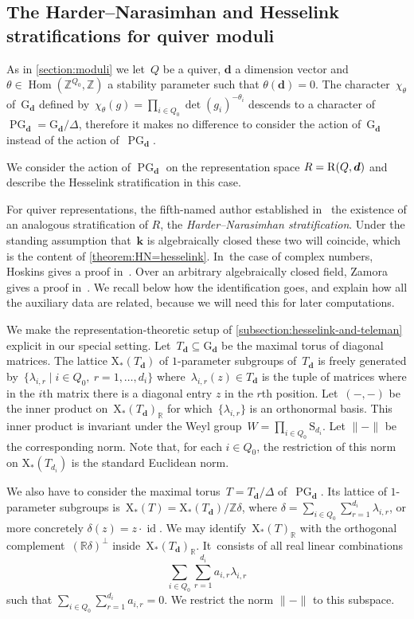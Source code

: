 \documentclass[11pt]{article}
\newcommand{\Subsection}{\subsection}
\theoremstyle{plain}
\theoremstyle{definition}
\DeclareMathOperator\Hom{Hom}
\DeclareMathOperator\PG{PG}
\newcommand\cocharacters{\ensuremath{\mathrm{X}_*}}
\newcommand\field{\mathbf{k}}
\newcommand\group[1][\tuple{d}]{\mathrm{G}_{#1}}
\newcommand\tuple[1]{\ensuremath{{\boldsymbol{#1}}}}
\begin{document}
\Subsection{The Harder--Narasimhan and Hesselink stratifications for quiver moduli}
\label{section:HN-vs-Hesselink}
As in \cref{section:moduli}
we let~$Q$ be a quiver, $\tuple{d}$ a dimension vector
and~$\theta \in\Hom(\mathbb{Z}^{Q_0},\mathbb{Z})$ a stability parameter
such that $\theta(\tuple{d})=0$.
The character~$\chi_\theta$ of~$\group$ defined by~$\chi_\theta(g) = \prod_{i \in Q_0} \det(g_i)^{-\theta_i}$
descends to a character of~$\PG_{\tuple{d}} = \group/\Delta$,
therefore it makes no difference to consider the action of~$\group$ instead of the action of~$\PG_{\tuple{d}}$.

We consider the action of $\PG_{\tuple{d}}$ on the representation space $R = \repspace{Q,\tuple{d}}$
and describe the Hesselink stratification in this case.

For quiver representations, the fifth-named author established in~\cite[Prop.\,3.4]{MR1974891}
the existence of an analogous stratification of $R$, the \emph{Harder--Narasimhan stratification}.
Under the standing assumption that~$\field$ is algebraically closed these two will coincide,
which is the content of \cref{theorem:HN=hesselink}. In~the case of complex numbers,
Hoskins gives a proof in~\cite[Th.\,3.8]{MR3871820}.
Over an arbitrary algebraically closed field,
Zamora gives a proof in~\cite[Th.\,6.3]{MR3199484}.
We recall below how the identification goes,
and explain how all the auxiliary data are related,
because we will need this for later computations.

We make the representation-theoretic setup of \cref{subsection:hesselink-and-teleman}
explicit in our special setting.
Let~$T_{\tuple{d}} \subseteq \group$ be the maximal torus of diagonal matrices.
The lattice $\cocharacters(T_{\tuple{d}})$ of $1$-parameter subgroups of~$T_{\tuple{d}}$
is freely generated by~$\{\lambda_{i,r} \mid i \in Q_0,\ r=1,\ldots,d_i\}$
where~$\lambda_{i,r}(z) \in T_{\tuple{d}}$
is the tuple of matrices where in the $i$th matrix there is a diagonal entry $z$
in the $r$th position.
Let~$(-,-)$ be the inner product on~$\cocharacters(T_{\tuple{d}})_\mathbb{R}$
for which~$\{\lambda_{i,r}\}$ is an orthonormal basis.
This inner product is invariant under the Weyl group~$W = \prod_{i \in Q_0}\mathrm{S}_{d_i}$.
Let $\|{-}\|$ be the corresponding norm.
Note that,
for each $i \in Q_0$,
the restriction of this norm on $\cocharacters(T_{d_i})$ is the standard Euclidean norm.

We also have to consider the maximal torus~$T = T_{\tuple{d}}/\Delta$ of~$\PG_{\tuple{d}}$.
Its lattice of $1$-parameter subgroups is~$\cocharacters(T) = \cocharacters(T_{\tuple{d}})/\mathbb{Z}\delta$,
where $\delta = \sum_{i\in Q_0}\sum_{r=1}^{d_i}\lambda_{i,r}$,
or more concretely $\delta(z) \!=\! z\cdot \operatorname{id}$.
We may identify~$\cocharacters(T)_\mathbb{R}$ with
the \hbox{orthogonal} complement~$(\mathbb{R}\delta)^\bot$ inside~$\cocharacters(T_{\tuple{d}})_\mathbb{R}$. It~consists of all real linear combinations
\[
\sum_{i\in Q_0}\sum_{r=1}^{d_i} a_{i,r}\lambda_{i,r}
\]
such that $\sum_{i\in Q_0}\sum_{r=1}^{d_i} a_{i,r} = 0$.
We restrict the norm $\|{-}\|$ to this subspace.
\end{document}
